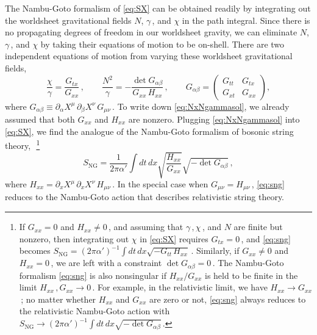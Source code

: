 \documentclass[11pt]{article}
\newcommand{\be}{\begin{equation}}
\newcommand{\ee}{\end{equation}}
\newcommand{\p}{\partial}
\begin{document}
The Nambu-Goto formalism of \eqref{eq:SX} can be obtained readily by integrating out the worldsheet gravitational fields $N$, $\gamma$\,, and $\chi$ in the path integral. Since there is no propagating degrees of freedom in our worldsheet gravity, we can eliminate $N$, $\gamma$\,, and $\chi$ by taking their equations of motion to be on-shell. There are two independent equations of motion from varying these worldsheet gravitational fields,
%
\be \label{eq:NxNgammasol}
	\frac{\chi}{\gamma} = \frac{G_{tx}}{G_{xx}}\,,
		\qquad
	\frac{N^2}{\gamma} = - \frac{\det G_{\alpha\beta}}{G_{xx} \, H_{xx}}\,,
		\qquad
	G_{\alpha\beta} = 
		\begin{pmatrix}
			G_{tt} & G_{tx} \\
			G_{xt} & G_{xx}
		\end{pmatrix},
\ee
%
where $G_{\alpha\beta} \equiv \p_\alpha X^\mu \, \p_\beta X^\nu \, G_{\mu\nu}$\,. To write down \eqref{eq:NxNgammasol}, we already assumed that both $G_{xx}$ and $H_{xx}$ are nonzero. Plugging \eqref{eq:NxNgammasol} into \eqref{eq:SX}, we find the analogue of the Nambu-Goto formalism of bosonic string theory,~\,\footnote{If $G_{xx} = 0$ and $H_{xx} \neq 0$\,, and assuming that $\gamma\,, \chi$\,, and $N$ are finite but nonzero, then integrating out $\chi$ in \eqref{eq:SX} requires $G_{tx} = 0$\,, and \eqref{eq:sng} becomes $S_\text{NG} = (2\pi\alpha')^{-1} \int dt \, dx \sqrt{- G_{tt} \, H_{xx}}$\,. Similarly, if $G_{xx} \neq 0$ and $H_{xx} = 0$\,, we are left with a constraint $\det G_{\alpha\beta} = 0$\,. The Nambu-Goto formalism \eqref{eq:sng} is also nonsingular if $H_{xx} / G_{xx}$ is held to be finite in the limit $H_{xx}\,, G_{xx} \rightarrow 0$\,. For example, in the relativistic limit, we have $H_{xx} \rightarrow G_{xx}$\,; no matter whether $H_{xx}$ and $G_{xx}$ are zero or not, \eqref{eq:sng} always reduces to the relativistic Nambu-Goto action with $S_\text{NG} \rightarrow (2\pi\alpha')^{-1} \int dt \, dx \sqrt{- \det G_{\alpha\beta}}$\,.
}
%
\be \label{eq:sng}
	S_\text{NG} = \frac{1}{2\pi\alpha'} \int dt \, dx \sqrt{\frac{H_{xx}}{G_{xx}}} \sqrt{- \det G_{\alpha\beta}}\,,
\ee
%
where $H_{xx} = \p_x X^\mu \, \p_x X^\nu \, H_{\mu\nu}$\,. In the special case when $G_{\mu\nu} = H_{\mu\nu}$\,, \eqref{eq:sng} reduces to the Nambu-Goto action that describes relativistic string theory.
\end{document}
